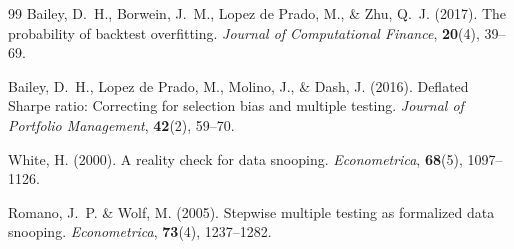 \documentclass[10pt,leqno]{amsart}
\begin{document}
\begin{thebibliography}{99}
 Bailey, D.~H., Borwein, J.~M., Lopez de Prado, M., \& Zhu, Q.~J. (2017). The probability of backtest overfitting. \textit{Journal of Computational Finance}, \textbf{20}(4), 39--69.

 Bailey, D.~H., Lopez de Prado, M., Molino, J., \& Dash, J. (2016). Deflated Sharpe ratio: Correcting for selection bias and multiple testing. \textit{Journal of Portfolio Management}, \textbf{42}(2), 59--70.

 White, H. (2000). A reality check for data snooping. \textit{Econometrica}, \textbf{68}(5), 1097--1126.

 Romano, J.~P. \& Wolf, M. (2005). Stepwise multiple testing as formalized data snooping. \textit{Econometrica}, \textbf{73}(4), 1237--1282.

\end{thebibliography}
\end{document}
